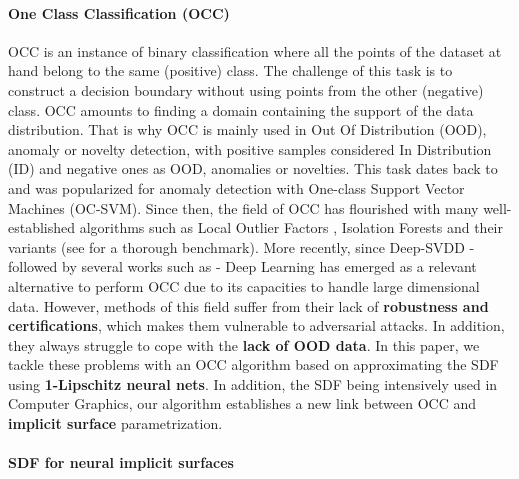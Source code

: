 \paragraph{One Class Classification (OCC)} OCC is an instance of binary classification where all the points of the dataset at hand belong to the same (positive) class. The challenge of this task is to construct a decision boundary without using points from the other (negative) class. OCC amounts to finding a domain containing the support of the data distribution. That is why OCC is mainly used in Out Of Distribution (OOD), anomaly or novelty detection, with positive samples considered In Distribution (ID) and negative ones as OOD, anomalies or novelties. This task dates back to \cite{sager_iterative_1979, hartigan_estimation_1987} and was popularized for anomaly detection with One-class Support Vector Machines (OC-SVM)\cite{scholkopf_support_1999}. Since then, the field of OCC has flourished with many well-established algorithms such as Local Outlier Factors \cite{breuning_lof_2000}, Isolation Forests \cite{liu2008isolation} and their variants (see \cite{han_adbench_nodate} for a thorough benchmark). More recently, since Deep-SVDD \cite{ruff2018deep} - followed by several works such as \cite{bergman2019classification,golan_geometric_2018,goyal_drocc_2020,zenati_adversarially_2018,sabokrou2018adversarially} - Deep Learning has emerged as a relevant alternative to perform OCC due to its capacities to handle large dimensional data. However, methods of this field suffer from their lack of \textbf{robustness and certifications}, which makes them vulnerable to adversarial attacks. In addition, they always struggle to cope with the \textbf{lack of OOD data}. In this paper, we tackle these problems with an OCC algorithm based on approximating the SDF using \textbf{1-Lipschitz neural nets}. In addition, the SDF being intensively used in Computer Graphics, our algorithm establishes a new link between OCC and \textbf{implicit surface} parametrization.

\paragraph{SDF for neural implicit surfaces}

